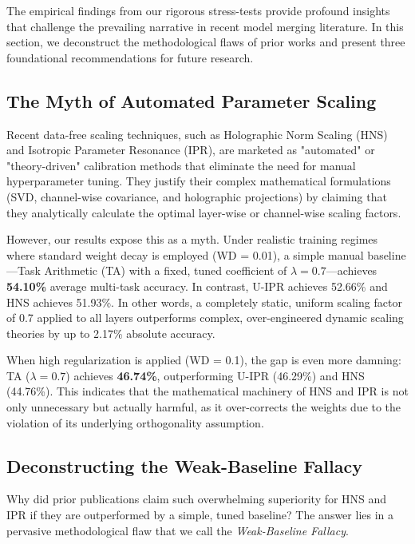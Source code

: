 \documentclass{article}
\theoremstyle{plain}
\theoremstyle{definition}
\theoremstyle{remark}
\begin{document}
The empirical findings from our rigorous stress-tests provide profound insights that challenge the prevailing narrative in recent model merging literature. In this section, we deconstruct the methodological flaws of prior works and present three foundational recommendations for future research.

\subsection{The Myth of Automated Parameter Scaling}

Recent data-free scaling techniques, such as Holographic Norm Scaling (HNS) and Isotropic Parameter Resonance (IPR), are marketed as "automated" or "theory-driven" calibration methods that eliminate the need for manual hyperparameter tuning. They justify their complex mathematical formulations (SVD, channel-wise covariance, and holographic projections) by claiming that they analytically calculate the optimal layer-wise or channel-wise scaling factors.

However, our results expose this as a myth. Under realistic training regimes where standard weight decay is employed (WD = 0.01), a simple manual baseline---Task Arithmetic (TA) with a fixed, tuned coefficient of $\lambda = 0.7$---achieves \textbf{54.10\%} average multi-task accuracy. In contrast, U-IPR achieves 52.66\% and HNS achieves 51.93\%. In other words, a completely static, uniform scaling factor of 0.7 applied to all layers outperforms complex, over-engineered dynamic scaling theories by up to 2.17\% absolute accuracy.

When high regularization is applied (WD = 0.1), the gap is even more damning: TA ($\lambda = 0.7$) achieves \textbf{46.74\%}, outperforming U-IPR (46.29\%) and HNS (44.76\%). This indicates that the mathematical machinery of HNS and IPR is not only unnecessary but actually harmful, as it over-corrects the weights due to the violation of its underlying orthogonality assumption.

\subsection{Deconstructing the Weak-Baseline Fallacy}

Why did prior publications claim such overwhelming superiority for HNS and IPR if they are outperformed by a simple, tuned baseline? The answer lies in a pervasive methodological flaw that we call the \textit{Weak-Baseline Fallacy}. 
\end{document}
